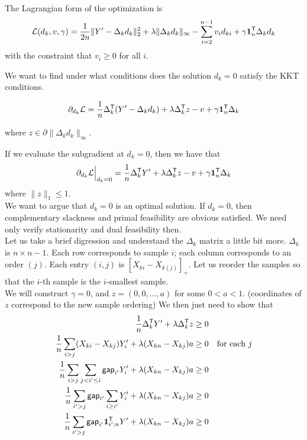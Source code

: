 \documentclass{article}
\begin{document}
The Lagrangian form of the optimization is
\[
\mathcal{L}(d_k, v, \gamma) =
  \frac{1}{2n} \| Y' -  \Delta_k d_k \|_2^2 + \lambda \| \Delta_k d_k \|_\infty
  - \sum_{i=2}^{n-1} v_i d_{ki} + \gamma \mathbf{1}_n^{\mathsf{T}} \Delta_k d_k
\]
with the constraint that $v_i \geq 0$ for all $i$. 

We want to find under what conditions does the solution $d_k = 0$ satisfy the KKT conditions.

\[
\partial_{d_k} \mathcal{L} = 
  \frac{1}{n} \Delta_k^{\mathsf{T}} ( Y' - \Delta_k d_k) + \lambda \Delta_k^{\mathsf{T}} z 
  - v + \gamma \mathbf{1}_n^{\mathsf{T}} \Delta_k
\]

where $z \in \partial \| \Delta_k d_k \|_\infty$.

If we evaluate the subgradient at $d_k = 0$, then we have that
\[
\partial_{d_k} \mathcal{L} \Big|_{d_k=0} = \frac{1}{n} \Delta_k^{\mathsf{T}} Y' + \lambda \Delta_k^{\mathsf{T}} z - v + \gamma \mathbf{1}_n^{\mathsf{T}} \Delta_k
\]
where $\| z \|_1 \leq 1$. \\

We want to argue that $d_k = 0$ is an optimal solution. If $d_k = 0$, then complementary slackness and primal feasibility are obvious satisfied. We need only verify stationarity and dual feasibility then.\\

Let us take a brief digression and understand the $\Delta_k$ matrix a little bit more. $\Delta_k$ is $n \times n-1$. Each row corresponds to sample $i$; each column corresponds to an order $(j)$. Each entry $(i,j)$ is $[ X_{ki} - X_{k(j)}]_+$.  Let us reorder the samples so that the $i$-th sample is the $i$-smallest sample. \\

We will construct $\gamma = 0$, and $z = (0, 0, ..., a)$ for some $0 < a < 1$. (coordinates of $z$ correspond to the new sample ordering) We then just need to show that
\begin{align*}
\frac{1}{n} \Delta_k^{\mathsf{T}} Y' + \lambda \Delta_k^{\mathsf{T}} z &\geq 0 \\
\frac{1}{n} \sum_{i > j} (X_{ki} - X_{kj}) Y'_i + \lambda (X_{kn} - X_{kj})a &\geq 0 \quad 
   \textrm{for each } j \\
\frac{1}{n} \sum_{i > j} \sum_{j < i' \leq i} \mathsf{gap}_{i'} Y'_i 
    + \lambda (X_{kn} - X_{kj})a &\geq 0 \\
\frac{1}{n} \sum_{i' > j} \mathsf{gap}_{i'} \sum_{i \geq i'} Y'_i 
    + \lambda (X_{kn} - X_{kj})a &\geq 0 \\
\frac{1}{n} \sum_{i' > j} \mathsf{gap}_{i'} \mathbf{1}_{i':n}^{\mathsf{T}} Y' 
   + \lambda (X_{kn} - X_{kj})a &\geq 0 
\end{align*}
\end{document}
